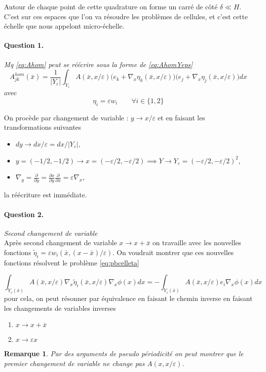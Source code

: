 \documentclass[11pt]{article}
\newtheorem{rmq}{Remarque}
\newcommand{\Ah}{A^{hom}}
\newcommand{\bx}{\bar{x}}
\newcommand{\teta}{\tilde{\eta}}
\newcommand{\Ye}{Y_\varepsilon}
\newcommand{\question}[2]{\paragraph{Question #1.}\textit{#2} \\}
\begin{document}
Autour de chaque point de cette quadrature on forme un carré de côté $\delta \ll H$. C'est sur ces espaces que l'on va résoudre les problèmes de
cellules, et c'est cette échelle que nous appelont micro-échelle.



\question{1}{Mq \autoref{eq:Ahom} peut se réécrire sous la forme de \autoref{eq:AhomYeps}}

\begin{equation}
  \label{eq:AhomYeps}
  \Ah_{jk}(\bx) = \frac{1}{|\Ye|}
  \int_{\Ye} A(\bx, x/\varepsilon) \big(e_k+\nabla_x \eta_k(\bx, x/\varepsilon)\big)\big(e_j+\nabla_x \eta_j(\bx, x/\varepsilon)\big) dx
\end{equation}
avec 
\[
  \eta_i = \varepsilon w_i \qquad \forall i \in \{1,2\}
\]

On procède par changement de variable : $ y \rightarrow x/\varepsilon $ et en faisant les transformations suivantes
\begin{itemize}
\item $dy \rightarrow dx/\varepsilon = dx/|\Ye|$,
\item $y=(-1/2, -1/2) \rightarrow x=(-\varepsilon/2, -\varepsilon/2) \implies Y \rightarrow \Ye = (-\varepsilon/2, -\varepsilon/2)^2$,
\item $\nabla_y = \frac{\partial}{\partial y} = \frac{\partial x}{\partial y}\frac{\partial}{\partial x} = \varepsilon \nabla_x $,
\end{itemize}
la réécriture est immédiate.

\question{2}{Second changement de variable}
Après second changement de variable $x\rightarrow x +\bx$ on travaille avec les nouvelles fonctions $\teta_i = \varepsilon w_i(\bx, (x-\bx)/\varepsilon)$.
On voudrait montrer que ces nouvelles fonctions résolvent le problème \autoref{eq:pbcelleta}

\begin{equation}
  \label{eq:pbcellteta}
  \int_{\Ye(\bx)} A(\bx, x/\varepsilon)\nabla_x \teta_i(\bx, x/\varepsilon) \nabla_x \phi(x) dx =
  - \int_{\Ye(\bx)} A(\bx, x/\varepsilon) e_i \nabla_x \phi(x) dx
\end{equation}
pour cela, on peut résonner par équivalence en faisant le chemin inverse en faisant les changements de variables inverses
\begin{enumerate}
\item $x\rightarrow x+\bx$
\item $x\rightarrow \varepsilon x$
\end{enumerate}
\begin{rmq}
  Par des arguments de pseudo périodicité on peut montrer que le premier changement de variable ne change pas $A(x, x/\varepsilon)$.
\end{rmq}
\end{document}
